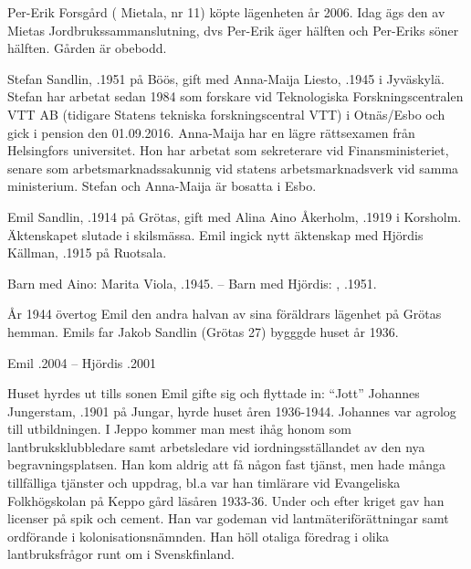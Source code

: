 
Per-Erik Forsgård ( Mietala, nr 11) köpte lägenheten år 2006. Idag ägs den av Mietas Jordbrukssammanslutning, dvs Per-Erik äger hälften och Per-Eriks söner hälften. Gården är obebodd.

Stefan Sandlin, .1951 på Böös, gift med Anna-Maija Liesto, .1945 i Jyväskylä. Stefan har arbetat sedan 1984 som forskare vid Teknologiska Forskningscentralen VTT AB (tidigare Statens tekniska forskningscentral VTT) i Otnäs/Esbo och gick i pension den 01.09.2016. Anna-Maija har en lägre rättsexamen från Helsingfors universitet. Hon har arbetat som sekreterare vid Finansministeriet, senare som arbetsmarknadssakunnig vid statens arbetsmarknadsverk vid samma ministerium. Stefan och Anna-Maija är bosatta i Esbo.

Emil Sandlin, .1914 på Grötas, gift med Alina Aino Åkerholm, .1919 i Korsholm. Äktenskapet slutade i skilsmässa. Emil ingick nytt äktenskap med Hjördis Källman, .1915 på Ruotsala.


Barn med Aino: Marita Viola, .1945. -- Barn med Hjördis: , .1951.

År 1944 övertog Emil den andra halvan av sina föräldrars lägenhet på Grötas hemman. Emils far Jakob Sandlin (Grötas 27) bygggde huset 			 år 1936.

Emil .2004  --  Hjördis .2001


Huset hyrdes ut tills sonen Emil gifte sig och flyttade in: ``Jott'' Johannes Jungerstam, .1901 på Jungar, hyrde huset åren 1936-1944. Johannes var agrolog till utbildningen. I Jeppo kommer man mest ihåg honom som lantbruksklubbledare samt arbetsledare vid iordningsställandet av den nya begravningsplatsen. Han kom aldrig att få någon fast tjänst, men hade många tillfälliga tjänster och uppdrag, bl.a var han timlärare vid Evangeliska Folkhögskolan på Keppo gård läsåren 1933-36. Under och efter kriget gav han licenser på spik och cement. Han var godeman vid lantmäteriförättningar samt ordförande i kolonisationsnämnden. Han höll otaliga föredrag i olika lantbruksfrågor runt om i Svenskfinland.

